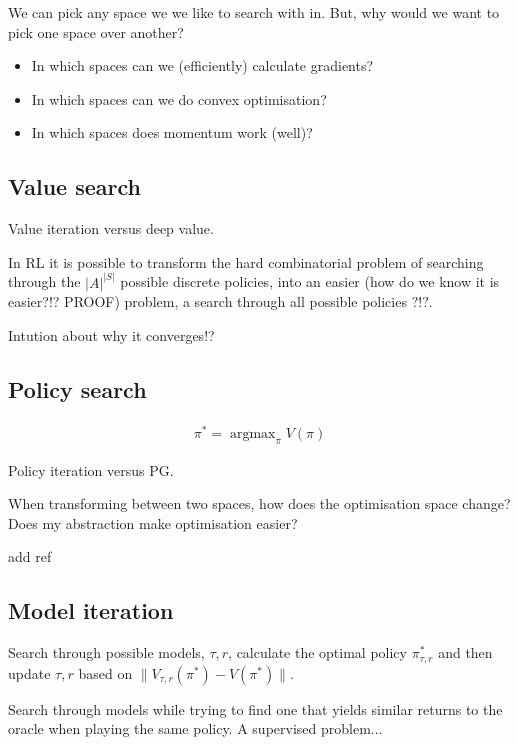 We can pick any space we we like to search with in. But, why would we want to pick one space over another?

\begin{itemize}
\tightlist
\item
  In which spaces can we (efficiently) calculate gradients?
\item
  In which spaces can we do convex optimisation?
\item
  In which spaces does momentum work (well)?
\end{itemize}


\subsection{Value search}

Value iteration versus deep value.

In RL it is possible to transform the hard combinatorial problem of
searching through the \(|A|^{|S|}\) possible discrete policies, into an
easier (how do we know it is easier?!? PROOF) problem, a search through
all possible policies \(?!?\).

Intution about why it converges!?

\cite{Bellman1957}

\subsection{Policy search}

\begin{align}
\pi^{* } = \mathop{\text{argmax}}_{\pi} V(\pi)
\end{align}

Policy iteration versus PG.

When transforming between two spaces, how does the optimisation space
change? Does my abstraction make optimisation easier?

add ref

\subsection{Model iteration}

Search through possible models, \(\tau, r\), calculate the optimal
policy \(\pi^{* }_{\tau, r}\) and then update \(\tau, r\) based on
\(\parallel V_{\tau, r}(\pi^{* }) - V(\pi^{* }) \parallel\).

Search through models while trying to find one that yields similar returns to the oracle when playing the same policy.
A supervised problem...

